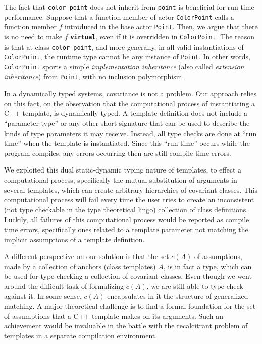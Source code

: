 \documentclass[11pt]{article}
\numberwithin{figure}{section}
\newcommand\CC{\Lang{\mbox{C++}}\xspace}
\newcommand\Lang[1]{\textsc{#1}}
\newcommand{\kw}[1]{\texttt{\textbf{#1}}}
\newcommand{\cd}[1]{\texttt{#1}}
\begin{document}
The fact that \cd{color\_point} does not inherit from
    \cd{point} is beneficial for run time performance.
Suppose that a function member of actor \cd{ColorPoint}
    calls a function member $f$ introduced in the base actor \cd{Point}.
Then, we argue that there is no need to make $f$ \kw{virtual},
    even if it is overridden in \cd{ColorPoint}.
The reason is that at class \cd{color\_point}, and more generally, in all
    valid instantiations of \cd{ColorPoint}, the runtime type
    cannot be any instance of \cd{Point}.
In other words, \cd{ColorPoint} sports a simple \emph{implementation inheritance}
    (also called \emph{extension inheritance})
    from \cd{Point}, with no inclusion polymorphism.


In a dynamically typed systems,
    covariance is not a problem.
Our approach relies on this fact,
    on the observation that the computational process of
    instantiating a \CC{} template, is dynamically typed.
A template definition does not include a ``parameter type'' or
    any other short signature that can be used to describe
    the kinds of type parameters it may receive.
Instead, all type checks are done at ``run time'' when the
    template is instantiated.
Since this ``run time'' occurs while the program compiles,
    any errors occurring then are still compile time errors.

We exploited this dual static-dynamic typing nature of templates,
    to effect a computational process, specifically the mutual
    substitution of arguments in several templates, which can create
    arbitrary hierarchies of covariant classes.
This computational process will fail every time the user tries to
    create an inconsistent
    (not type checkable in the type theoretical lingo) collection of
    class definitions.
Luckily, all failures of this computational process would be
    reported as compile
    time errors, specifically ones related to a template parameter
    not matching the implicit assumptions of a template definition.

A different perspective on our solution is that the set $c(A)$ of
    assumptions, made by a collection of anchors (class templates) $A$,
    is in fact a type, which can be used for type-checking a collection
    of covariant classes.
Even though we went around the difficult task of
    formalizing $c(A)$, we are still able to type check against it.
In some sense,  $c(A)$ encapsulates in it the structure of
    generalized matching.
A major theoretical challenge is to find a formal
    foundation for the set of assumptions that a \CC{}
    template makes on its arguments.
Such an achievement would be invaluable
    in the battle with the recalcitrant problem of
        templates in a separate compilation environment.
\end{document}
